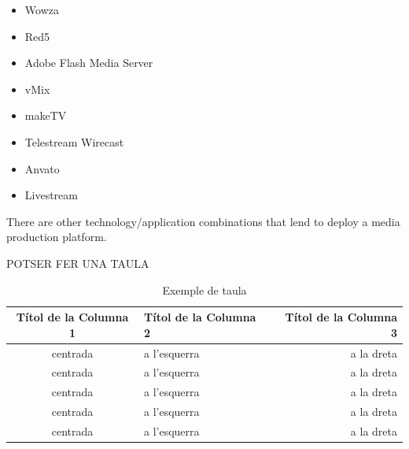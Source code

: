 \begin{itemize}
\item Wowza \hfill
 

\item Red5 \hfill


\item Adobe Flash Media Server \hfill


\item vMix \hfill


\item makeTV \hfill


\item Telestream Wirecast \hfill


\item Anvato \hfill


\item Livestream \hfill

\end{itemize}

There are other technology/application combinations that lend to deploy a media production platform.

POTSER FER UNA TAULA

\begin{table}[htb]
\caption{Exemple de taula}
\begin{center}
\begin{tabular}{|c|l|r|}
\hline
{\bf Títol de la Columna 1} & {\bf Títol de la Columna 2} & {\bf Títol de la Columna 3}  \\ \hline \hline
centrada        & a l'esquerra    & a la dreta       \\ \hline
centrada        & a l'esquerra    & a la dreta       \\ \hline
centrada        & a l'esquerra    & a la dreta       \\ \hline
centrada        & a l'esquerra    & a la dreta       \\ \hline
centrada        & a l'esquerra    & a la dreta       \\ \hline
\end{tabular}
\label{T:prova}
\end{center}
\end{table}

